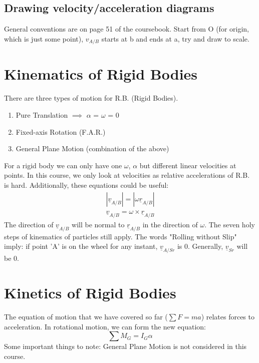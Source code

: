 \documentclass[a4paper, 12pt]{article}
\begin{document}
\subsection*{Drawing velocity/acceleration diagrams}
General conventions are on page 51 of the coursebook. Start from O (for origin, which is just some point),
$v_{A/B}$ starts at b and ends at a, try and draw to scale. 

\section*{Kinematics of Rigid Bodies}
There are three types of motion for R.B. (Rigid  Bodies). 
\begin{enumerate}
  \item Pure Translation $\implies$ $\alpha$ = $\omega$ = 0 
  \item Fixed-axis Rotation (F.A.R.) 
  \item General Plane Motion (combination of the above) 
\end{enumerate}

For a rigid body we can only have one $\omega$, $\alpha$ but different linear velocities at points. In this course, 
we only look at velocities as relative accelerations of R.B. is hard. Additionally, these equations could be useful:
\begin{align}
  |\underline{v}_{A/B}| = |\omega\underline{r}_{A/B}| \\
  \underline{v}_{A/B} = \omega\times\underline{r}_{A/B}
\end{align}
The direction of $\underline{v}_{A/B}$ will be normal to  $\underline{r}_{A/B}$ in the direction of $\omega$.
The seven holy steps of kinematics of particles still apply.
The words "Rolling without Slip" imply: if point 'A' is on the wheel for any instant, $\underline{v}_{A/Sr}$ is 0.
Generally, $\underline{v}_{Sr}$ will be 0.

\section*{Kinetics of Rigid Bodies}
The equation of motion that we have covered so far ($\sum F=ma$) relates forces to acceleration.
In rotational motion, we can form the new equation: 
\begin{equation}
  \sum M_G = I_G\alpha
\end{equation}
Some important things to note: General Plane Motion is not considered in this course. 
\end{document}
